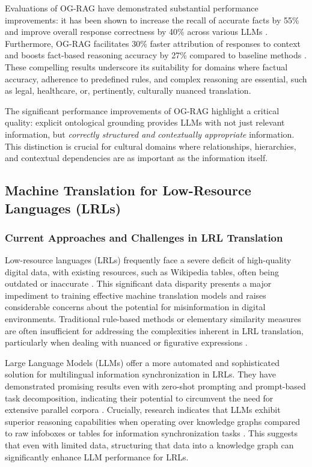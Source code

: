 \documentclass[12pt]{article}
\let\cite\textcite  %
\begin{document}
Evaluations of OG-RAG have demonstrated substantial performance improvements: it has been shown to increase the recall of accurate facts by 55\% and improve overall response correctness by 40\% across various LLMs \cite{chen2024og, chen2024integrating}. Furthermore, OG-RAG facilitates 30\% faster attribution of responses to context and boosts fact-based reasoning accuracy by 27\% compared to baseline methods \cite{chen2024og, chen2024integrating}. These compelling results underscore its suitability for domains where factual accuracy, adherence to predefined rules, and complex reasoning are essential, such as legal, healthcare, or, pertinently, culturally nuanced translation.

The significant performance improvements of OG-RAG highlight a critical quality: explicit ontological grounding provides LLMs with not just relevant information, but \emph{correctly structured and contextually appropriate} information. This distinction is crucial for cultural domains where relationships, hierarchies, and contextual dependencies are as important as the information itself.

\subsection{Machine Translation for Low-Resource Languages (LRLs)}

\subsubsection{Current Approaches and Challenges in LRL Translation}

Low-resource languages (LRLs) frequently face a severe deficit of high-quality digital data, with existing resources, such as Wikipedia tables, often being outdated or inaccurate \cite{datacamp2024kg}. This significant data disparity presents a major impediment to training effective machine translation models and raises considerable concerns about the potential for misinformation in digital environments. Traditional rule-based methods or elementary similarity measures are often insufficient for addressing the complexities inherent in LRL translation, particularly when dealing with nuanced or figurative expressions \cite{datacamp2024kg}.

Large Language Models (LLMs) offer a more automated and sophisticated solution for multilingual information synchronization in LRLs. They have demonstrated promising results even with zero-shot prompting and prompt-based task decomposition, indicating their potential to circumvent the need for extensive parallel corpora \cite{datacamp2024kg}. Crucially, research indicates that LLMs exhibit superior reasoning capabilities when operating over knowledge graphs compared to raw infoboxes or tables for information synchronization tasks \cite{datacamp2024kg}. This suggests that even with limited data, structuring that data into a knowledge graph can significantly enhance LLM performance for LRLs.
\end{document}
